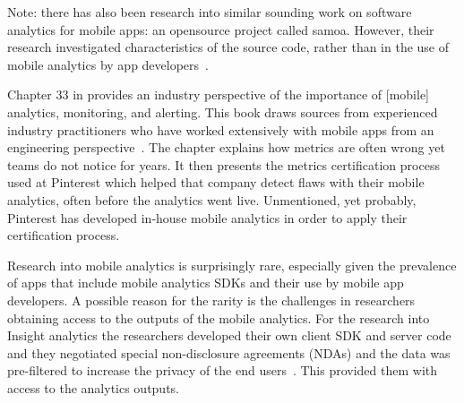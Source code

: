 
Note: there has also been research into similar sounding work on software analytics for mobile apps: an opensource project called \Gls{samoa}. However, their research investigated characteristics of the source code, rather than in the use of mobile analytics by app developers~.

Chapter 33 in  provides an industry perspective of the importance of [mobile] analytics, monitoring, and alerting. This book draws sources from experienced industry practitioners who have worked extensively with mobile apps from an engineering perspective~. The chapter explains how metrics are often wrong yet teams do not notice for years. It then presents the metrics certification process used at Pinterest which helped that company detect flaws with their mobile analytics, often before the analytics went live. Unmentioned, yet probably, Pinterest has developed in-house mobile analytics in order to apply their certification process.

Research into mobile analytics is surprisingly rare, especially given the prevalence of apps that include mobile analytics SDKs and their use by mobile app developers. A possible reason for the rarity is the challenges in researchers obtaining access to the outputs of the mobile analytics. For the research into Insight analytics the researchers developed their own client SDK and server code and they negotiated special non-disclosure agreements (NDAs) and the data was pre-filtered to increase the privacy of the end users~. This provided them with access to the analytics outputs.

